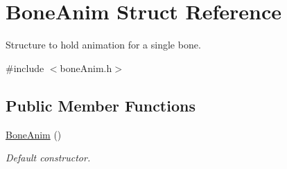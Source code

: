 \hypertarget{structBoneAnim}{}\section{Bone\+Anim Struct Reference}
\label{structBoneAnim}


Structure to hold animation for a single bone.  




{\ttfamily \#include $<$bone\+Anim.\+h$>$}

\subsection*{Public Member Functions}
\begin{DoxyCompactItemize}
\item 
\hyperlink{structBoneAnim_a84f2285cfdfa7d53ca88a8c0931c2e1d}{Bone\+Anim} ()\hypertarget{structBoneAnim_a84f2285cfdfa7d53ca88a8c0931c2e1d}{}\label{structBoneAnim_a84f2285cfdfa7d53ca88a8c0931c2e1d}

\begin{DoxyCompactList}\small\item\em Default constructor. \end{DoxyCompactList}\end{DoxyCompactItemize}
